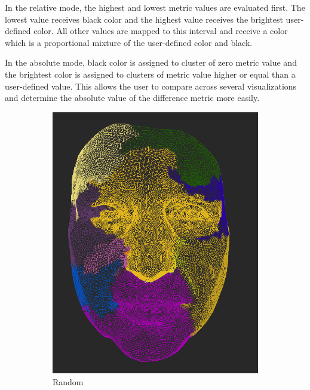 In the relative mode, the highest and lowest metric values are evaluated first. The lowest value receives black color and the highest value receives the brightest user-defined color. All other values are mapped to this interval and receive a color which is a proportional mixture of the user-defined color and black.

In the absolute mode, black color is assigned to cluster of zero metric value and the brightest color is assigned to clusters of metric value higher or equal than a user-defined value. This allows the user to compare across several visualizations and determine the absolute value of the difference metric more easily.

\begin{figure}[h]
\centering
	\begin{subfigure}{0.4\textwidth}
	\includegraphics[width=\textwidth]{./img/meshdiff-clustercolor-random.PNG}
    \caption{Random}
    \label{fig:meshdiff-clustercolor_random}
	\end{subfigure}
    \qquad
    \begin{subfigure}{0.4\textwidth}

\end{subfigure}
\end{figure}
